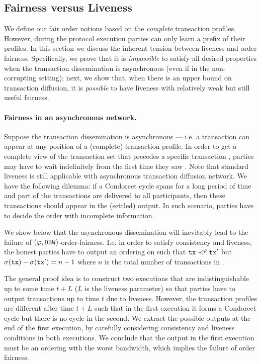 \subsection{Fairness versus Liveness}
\label{subsec:fairness-versus-liveness}

We define our fair order notions based on the \emph{complete} transaction profiles.
%
However, during the protocol execution parties can only learn a prefix of their profiles.
%
In this section we discuss the inherent tension between liveness and order fairness.
%
Specifically, we prove that it is \emph{impossible} to satisfy all desired properties when the transaction dissemination is asynchronous (even if in the non-corrupting setting);
%
next, we show that, when there is an upper bound on transaction diffusion, it is \emph{possible} to have liveness with relatively weak but still useful fairness.

\paragraph{Fairness in an asynchronous network.}
%
Suppose the transaction dissemination is asynchronous --- i.e. a transaction can appear at any position of a (complete) transaction profile.
%
In order to get a complete view of the transaction set that precedes a specific transaction \tx, parties may have to wait indefinitely from the first time they saw \tx.
%
Note that standard liveness is still applicable with asynchronous transaction diffusion network.
%
We have the following dilemma: if a Condorcet cycle spans for a long period of time and part of the transactions are delivered to all participants, then these transactions should appear in the (settled) output.
%
In such scenario, parties have to decide the order with incomplete information.

We show below that the asynchronous dissemination will inevitably lead to the failure of $(\varphi, \mathtt{DBW})$-order-fairness.
%
I.e. in order to satisfy consistency and liveness, the honest parties have to output an ordering \orderOutput on \profileSet such that $\mathtt{tx} \prec^\varphi \mathtt{tx}'$ but $\sigma(\mathtt{tx}) - \sigma(\mathtt{tx}') = n - 1$ where $n$ is the total number of transactions in \profileSet.

The general proof idea is to construct two executions that are indistinguishable up to some time $t + L$ ($L$ is the liveness parameter) so that parties have to output transactions up to time $t$ due to liveness.
%
However, the transaction profiles are different after time $t + L$ such that in the first execution it forms a Condorcet cycle but there is no cycle in the second.
%
We extract the possible outputs at the end of the first execution, by carefully considering consistency and liveness conditions in both executions.
%
We conclude that the output in the first execution must be an ordering with the worst bandwidth, which implies the failure of order fairness.

